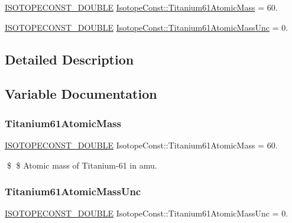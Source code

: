 \begin{DoxyCompactItemize}
\item 
\mbox{\hyperlink{group___isotope_const-_macros_ga8f45a7272ce02c0b4c65c44636ed719a}{I\+S\+O\+T\+O\+P\+E\+C\+O\+N\+S\+T\+\_\+\+D\+O\+U\+B\+LE}} \mbox{\hyperlink{group___isotope_const-_titanium-_ti61_ga18bda98e405f58e5b71e7e8c2a14963c}{Isotope\+Const\+::\+Titanium61\+Atomic\+Mass}} = 60.
\item 
\mbox{\hyperlink{group___isotope_const-_macros_ga8f45a7272ce02c0b4c65c44636ed719a}{I\+S\+O\+T\+O\+P\+E\+C\+O\+N\+S\+T\+\_\+\+D\+O\+U\+B\+LE}} \mbox{\hyperlink{group___isotope_const-_titanium-_ti61_gad4fd3a2e60658d4a1080c3432b126523}{Isotope\+Const\+::\+Titanium61\+Atomic\+Mass\+Unc}} = 0.
\end{DoxyCompactItemize}


\subsection{Detailed Description}


\subsection{Variable Documentation}
\mbox{\label{group___isotope_const-_titanium-_ti61_ga18bda98e405f58e5b71e7e8c2a14963c}} 
\subsubsection{\texorpdfstring{Titanium61\+Atomic\+Mass}{Titanium61AtomicMass}}
{\footnotesize\ttfamily \mbox{\hyperlink{group___isotope_const-_macros_ga8f45a7272ce02c0b4c65c44636ed719a}{I\+S\+O\+T\+O\+P\+E\+C\+O\+N\+S\+T\+\_\+\+D\+O\+U\+B\+LE}} Isotope\+Const\+::\+Titanium61\+Atomic\+Mass = 60.}

\$ \$ Atomic mass of Titanium-\/61 in amu. \mbox{\label{group___isotope_const-_titanium-_ti61_gad4fd3a2e60658d4a1080c3432b126523}} 
\subsubsection{\texorpdfstring{Titanium61\+Atomic\+Mass\+Unc}{Titanium61AtomicMassUnc}}
{\footnotesize\ttfamily \mbox{\hyperlink{group___isotope_const-_macros_ga8f45a7272ce02c0b4c65c44636ed719a}{I\+S\+O\+T\+O\+P\+E\+C\+O\+N\+S\+T\+\_\+\+D\+O\+U\+B\+LE}} Isotope\+Const\+::\+Titanium61\+Atomic\+Mass\+Unc = 0.}

